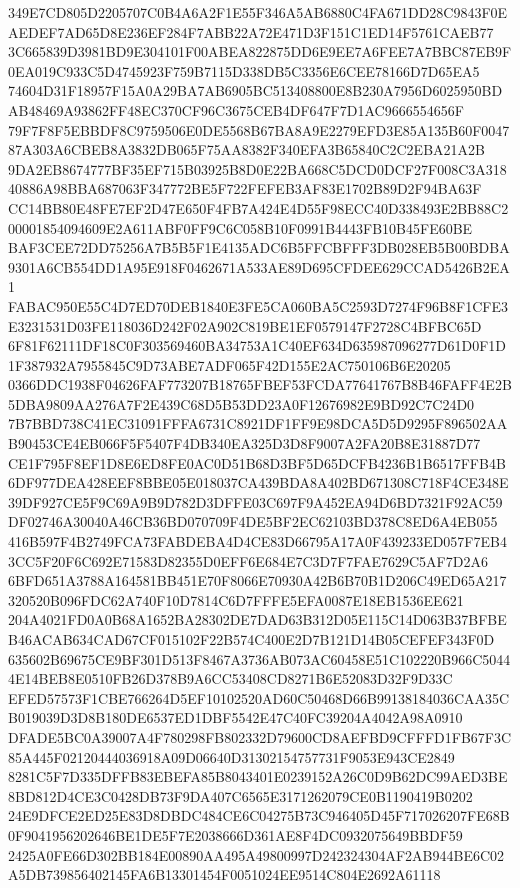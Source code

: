 \documentclass[UTF8,fontset=fandol,zihao=-4,a4paper]{ctexart}
\begin{document}
{{349E7CD805D2205707C0B4A6A2F1E55F346A5AB6880C4FA671DD28C9843F0EAEDEF7AD65D8E236EF284F7ABB22A72E471D3F151C1ED14F5761CAEB77
3C665839D3981BD9E304101F00ABEA822875DD6E9EE7A6FEE7A7BBC87EB9F0EA019C933C5D4745923F759B7115D338DB5C3356E6CEE78166D7D65EA5
74604D31F18957F15A0A29BA7AB6905BC513408800E8B230A7956D6025950BDAB48469A93862FF48EC370CF96C3675CEB4DF647F7D1AC9666554656F
79F7F8F5EBBDF8C9759506E0DE5568B67BA8A9E2279EFD3E85A135B60F004787A303A6CBEB8A3832DB065F75AA8382F340EFA3B65840C2C2EBA21A2B
9DA2EB8674777BF35EF715B03925B8D0E22BA668C5DCD0DCF27F008C3A31840886A98BBA687063F347772BE5F722FEFEB3AF83E1702B89D2F94BA63F
CC14BB80E48FE7EF2D47E650F4FB7A424E4D55F98ECC40D338493E2BB88C200001854094609E2A611ABF0FF9C6C058B10F0991B4443FB10B45FE60BE
BAF3CEE72DD75256A7B5B5F1E4135ADC6B5FFCBFFF3DB028EB5B00BDBA9301A6CB554DD1A95E918F0462671A533AE89D695CFDEE629CCAD5426B2EA1
FABAC950E55C4D7ED70DEB1840E3FE5CA060BA5C2593D7274F96B8F1CFE3E3231531D03FE118036D242F02A902C819BE1EF0579147F2728C4BFBC65D
6F81F62111DF18C0F303569460BA34753A1C40EF634D635987096277D61D0F1D1F387932A7955845C9D73ABE7ADF065F42D155E2AC750106B6E20205
0366DDC1938F04626FAF773207B18765FBEF53FCDA77641767B8B46FAFF4E2B5DBA9809AA276A7F2E439C68D5B53DD23A0F12676982E9BD92C7C24D0
7B7BBD738C41EC31091FFFA6731C8921DF1FF9E98DCA5D5D9295F896502AAB90453CE4EB066F5F5407F4DB340EA325D3D8F9007A2FA20B8E31887D77
CE1F795F8EF1D8E6ED8FE0AC0D51B68D3BF5D65DCFB4236B1B6517FFB4B6DF977DEA428EEF8BBE05E018037CA439BDA8A402BD671308C718F4CE348E
39DF927CE5F9C69A9B9D782D3DFFE03C697F9A452EA94D6BD7321F92AC59DF02746A30040A46CB36BD070709F4DE5BF2EC62103BD378C8ED6A4EB055
416B597F4B2749FCA73FABDEBA4D4CE83D66795A17A0F439233ED057F7EB43CC5F20F6C692E71583D82355D0EFF6E684E7C3D7F7FAE7629C5AF7D2A6
6BFD651A3788A164581BB451E70F8066E70930A42B6B70B1D206C49ED65A217320520B096FDC62A740F10D7814C6D7FFFE5EFA0087E18EB1536EE621
204A4021FD0A0B68A1652BA28302DE7DAD63B312D05E115C14D063B37BFBEB46ACAB634CAD67CF015102F22B574C400E2D7B121D14B05CEFEF343F0D
635602B69675CE9BF301D513F8467A3736AB073AC60458E51C102220B966C50444E14BEB8E0510FB26D378B9A6CC53408CD8271B6E52083D32F9D33C
EFED57573F1CBE766264D5EF10102520AD60C50468D66B99138184036CAA35CB019039D3D8B180DE6537ED1DBF5542E47C40FC39204A4042A98A0910
DFADE5BC0A39007A4F780298FB802332D79600CD8AEFBD9CFFFD1FB67F3C85A445F02120444036918A09D06640D31302154757731F9053E943CE2849
8281C5F7D335DFFB83EBEFA85B8043401E0239152A26C0D9B62DC99AED3BE8BD812D4CE3C0428DB73F9DA407C6565E3171262079CE0B1190419B0202
24E9DFCE2ED25E83D8DBDC484CE6C04275B73C946405D45F717026207FE68B0F9041956202646BE1DE5F7E2038666D361AE8F4DC0932075649BBDF59
2425A0FE66D302BB184E00890AA495A49800997D242324304AF2AB944BE6C02A5DB739856402145FA6B13301454F0051024EE9514C804E2692A61118
}}
\end{document}
